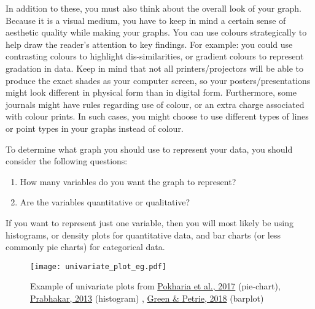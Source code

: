 \documentclass{article}
\begin{document}
In addition to these, you must also think about the overall look of your graph. Because it is a visual medium, you have to keep in mind a certain sense of aesthetic quality while making your graphs. You can use colours strategically to help draw the reader’s attention to key findings. For example: you could use contrasting colours to highlight dis-similarities, or gradient colours to represent gradation in data. Keep in mind that not all printers/projectors will be able to produce the exact shades as your computer screen, so your posters/presentations might look different in physical form than in digital form. Furthermore, some journals might have rules regarding use of colour, or an extra charge associated with colour prints. In such cases, you might choose to use different types of lines or point types in your graphs instead of colour.

To determine what graph you should use to represent your data, you should consider the following questions:
\begin{enumerate}
    \item How many variables do you want the graph to represent?
    \item Are the variables quantitative or qualitative?
\end{enumerate}

If you want to represent just one variable, then you will most likely be using histograms, or density plots for quantitative data, and bar charts (or less commonly pie charts) for categorical data.

\newpage
\begin{figure}[hbt!]
    \centering
    \texttt{[image: univariate\_plot\_eg.pdf]}
    \caption{Example of univariate plots from \protect\hyperlink{pokharia}{Pokharia et al., 2017} (pie-chart), \protect\hyperlink{prabhakar}{Prabhakar, 2013} (histogram) , \protect\hyperlink{green}{Green \& Petrie, 2018} (barplot)}
    \label{fig:univariate_plot}
\end{figure}


\end{document}
